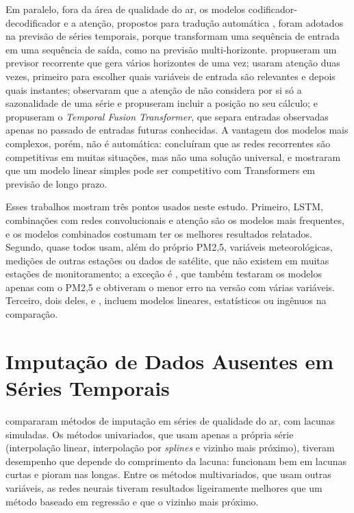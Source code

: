 Em paralelo, fora da área de qualidade do ar, os modelos codificador-decodificador e a atenção, propostos para tradução automática \cite{sutskever2014sequence,bahdanau2014neural,luong2015effective}, foram adotados na previsão de séries temporais, porque transformam uma sequência de entrada em uma sequência de saída, como na previsão multi-horizonte.  propuseram um previsor recorrente que gera vários horizontes de uma vez;  usaram atenção duas vezes, primeiro para escolher quais variáveis de entrada são relevantes e depois quais instantes;  observaram que a atenção de  não considera por si só a sazonalidade de uma série e propuseram incluir a posição no seu cálculo; e  propuseram o \textit{Temporal Fusion Transformer}, que separa entradas observadas apenas no passado de entradas futuras conhecidas. A vantagem dos modelos mais complexos, porém, não é automática:  concluíram que as redes recorrentes são competitivas em muitas situações, mas não uma solução universal, e  mostraram que um modelo linear simples pode ser competitivo com Transformers em previsão de longo prazo.

Esses trabalhos mostram três pontos usados neste estudo. Primeiro, LSTM, combinações com redes convolucionais e atenção são os modelos mais frequentes, e os modelos combinados costumam ter os melhores resultados relatados. Segundo, quase todos usam, além do próprio PM2,5, variáveis meteorológicas, medições de outras estações ou dados de satélite, que não existem em muitas estações de monitoramento; a exceção é , que também testaram os modelos apenas com o PM2,5 e obtiveram o menor erro na versão com várias variáveis. Terceiro, dois deles,  e , incluem modelos lineares, estatísticos ou ingênuos na comparação.

\section{Imputação de Dados Ausentes em Séries Temporais}
\label{sec:relacionados_imputacao}

 compararam métodos de imputação em séries de qualidade do ar, com lacunas simuladas. Os métodos univariados, que usam apenas a própria série (interpolação linear, interpolação por \textit{splines} e vizinho mais próximo), tiveram desempenho que depende do comprimento da lacuna: funcionam bem em lacunas curtas e pioram nas longas. Entre os métodos multivariados, que usam outras variáveis, as redes neurais tiveram resultados ligeiramente melhores que um método baseado em regressão e que o vizinho mais próximo.

